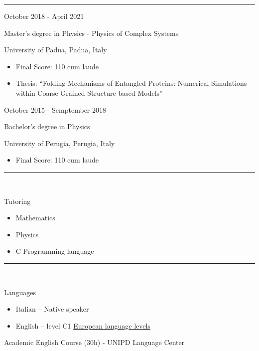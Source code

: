 \documentclass[a4paper,10pt]{article}
\newlength{\cvcolumngapwidth}
\newlength{\cvleftcolumnwidth}
\newlength{\cvrightcolumnwidth}
\newcommand{\cvsectionstyle}[1]{{\normalsize\cvsectionfont\textcolor{cvsectioncolor}{#1}}}
\newcommand{\cvtitlestyle}[1]{{\large\cvtitlefont\textcolor{cvtitlecolor}{#1}}}
\newcommand{\cvdurationstyle}[1]{{\small\cvdurationfont\textcolor{cvdurationcolor}{#1}}}
\newcommand{\cvheadingstyle}[1]{{\normalsize\cvheadingfont\textcolor{cvheadingcolor}{#1}}}
\newlength{\cvafteritemskipamount}
\newlength{\cvaftersectionskipamount}
\newlength{\cvbetweensectionandheadingextraskipamount}
\newlength{\cvaftertitleskipamount}
\newlength{\cvparskip}
\newcommand{\cvsection}[1]{
    \begin{minipage}[t]{\cvleftcolumnwidth}
        \raggedleft\cvsectionstyle{#1}
    \end{minipage}%
    \hspace{\cvcolumngapwidth}%
    \begin{minipage}[t]{\cvrightcolumnwidth}
        \textcolor{cvrulecolor}{\rule{\cvrightcolumnwidth}{0.3mm}}
    \end{minipage}

    \vspace{\cvaftersectionskipamount}
}
\newcommand{\cvitem}[2]{
    \begin{minipage}[t]{\cvleftcolumnwidth}
        \raggedleft #1
    \end{minipage}%
    \hspace{\cvcolumngapwidth}%
    \begin{minipage}[t]{\cvrightcolumnwidth}
        \setlength{\parskip}{\cvparskip} #2
    \end{minipage}

    \vspace{\cvafteritemskipamount}
}
\newcommand{\cvtitle}[1]{
    \cvtitlestyle{#1}

    \vspace{\cvaftertitleskipamount}
    \vspace{-\cvparskip}
}
\begin{document}

\cvsection{EDUCATION}


\cvitem{
    \cvdurationstyle{October 2018 - April 2021}
}{
    \cvtitle{Master's degree in Physics - Physics of Complex Systems}

    \cvdurationstyle{University of Padua, Padua, Italy} 

    \begin{itemize}[leftmargin=*]
        \item Final Score: 
        110 cum laude
        \item Thesis: ``Folding Mechanisms of Entangled Proteins: Numerical Simulations within Coarse-Grained Structure-based Models''
    \end{itemize}
}


\cvitem{
    \cvdurationstyle{October 2015 - Semptember 2018}

}{
    \cvtitle{Bachelor's degree in Physics}

    \cvdurationstyle{University of Perugia, Perugia, Italy}

    \begin{itemize}[leftmargin=*]
        \item Final Score: 
        110 cum laude
    \end{itemize}
}



\cvsection{OTHER EXPERIENCES}

\cvitem{
    \ 
}{
    \cvheadingstyle{Tutoring}
    \begin{itemize}[leftmargin=*]
        \item Mathematics
        \item Physics
        \item C Programming language
    \end{itemize}
}


\cvsection{SKILLS}

\vspace{\cvbetweensectionandheadingextraskipamount}

\cvitem{
    \ 
}{
    \cvheadingstyle{Languages}
    \begin{itemize}[leftmargin=*]
        \item Italian -- Native speaker
        \item English -- level C1
        \cvdurationstyle{\href{https://europass.cedefop.europa.eu/it/resources/european-language-levels-cefr}{European language levels}}        
    \end{itemize}
    Academic English Course (30h) - UNIPD Language Center 
    
}
\end{document}

